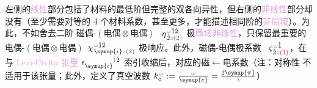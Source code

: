  左侧的\textcolor{Plum}{线性}部分包括了材料的最低阶但完整的\textcolor{PineGreen}{双各向异性}\cite{langeMultipoleTheoryHehl2015}，但右侧的\textcolor{Plum}{非线性}部分却没有（至少需要对等的 4 个材料系数，甚至更多，才能描述相同阶的\textcolor{Plum}{非局域}）。为此，不如舍去二阶 \textcolor{NavyBlue}{磁偶-$(\text{电偶}\otimes\text{电偶})$} $\Xint{\begin{smallmatrix} ~ \\ {}^{}_{\mathcolor{gray}{-}} \\ ~ \end{smallmatrix}}{17}{\eta}^{\;\! \mathcolor{gray}{\omega} \hat{1} \hat{2}}_{\;\! \dot{2} \mathcolor{gray}{z} \textcolor{Maroon}{(2)}}$ 极\textcolor{Plum}{局域}\textcolor{Plum}{非线性}，只保留最重要的\textcolor{NavyBlue}{电偶-$(\text{电偶}\otimes\text{电偶})$} $\Xint{{}^{}_{\mathcolor{gray}{-}}}{23}{\chi}^{\;\! \mathcolor{gray}{\omega} \hat{1} \hat{2}}_{\;\! \symup{\iota} \mathcolor{gray}{z} \textcolor{Maroon}{(2)}}$ 极响应。此外，\textcolor{NavyBlue}{磁偶-电偶}极系数 $\Xint{\begin{smallmatrix} ~ \\ {}^{}_{\mathcolor{gray}{-}} \\ ~ \end{smallmatrix}}{13}{\varsigma}^{\;\! \mathcolor{gray}{\omega} \hat{1}}_{\;\! \dot{2} \mathcolor{gray}{z} \textcolor{Maroon}{(1)}}$，在与 \textcolor{Plum}{Levi-Civita 张量} $\epsilon^{\hphantom{\symup{\iota}}\mathcolor{gray}{\dot{1}}\dot{2}}_{\symup{\iota}}$ 索引收缩后，对应的\textcolor{NavyBlue}{磁$\longleftarrow$电}系数（注：对称性  不适用于该张量；此外，定义了\textcolor{PineGreen}{真空波数} $k_{\textcolor{Maroon}{\mathsf{o}}}^{\;\! \mathcolor{gray}{\omega}} := \frac{\mathcolor{gray}{\omega}}{\symup{c}} = \frac{2 \symup{\pi}}{\mathcolor{gray}{\lambda}}$）
\abovedisplayskip=3pt
\belowdisplayskip=5pt
